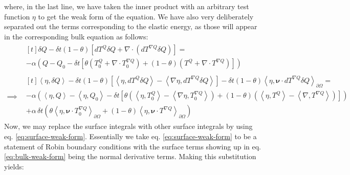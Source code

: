 \documentclass[reqno]{article}
\begin{document}
where, in the last line, we have taken the inner product with an arbitrary test function $\eta$ to get the weak form of the equation.
We have also very deliberately separated out the terms corresponding to the elastic energy, as those will appear in the corresponding bulk equation as follows:
\begin{equation} \label{eq:bulk-weak-form}
\begin{split}
&\begin{multlined}[t]
    \delta Q - \delta t \left(1 - \theta \right) \left[dT^Q \delta Q + \nabla \cdot \left( dT^{\nabla Q} \delta Q \right)\right] 
    = \\
    - \alpha \left( 
        Q - Q_0 - \delta t \left[ 
            \theta \left(T_0^Q + \nabla \cdot T_0^{\nabla Q} \right)
            + \left(1 - \theta \right) \left( T^Q + \nabla \cdot T^{\nabla Q} \right)
        \right]
    \right)
\end{multlined} \\
\implies
&\begin{multlined}[t]
    \left<\eta, \delta Q\right> 
    - \delta t \left(1 - \theta \right) \left[
        \left<\eta, dT^Q \delta Q\right> 
        - \left<\nabla \eta, dT^{\nabla Q} \delta Q \right>
    \right] 
    - \delta t \left(1 - \theta \right) \left< \eta, \boldsymbol\nu \cdot dT^{\nabla Q} \delta Q\right>_{\partial \Omega}
    = \\
    - \alpha \left( 
        \left<\eta, Q\right> - \left<\eta, Q_0\right> - \delta t \left[ 
            \theta \left(\left<\eta, T_0^Q\right> - \left<\nabla \eta, T_0^{\nabla Q} \right> \right)
            + \left(1 - \theta \right) \left( \left<\eta, T^Q\right> - \left<\nabla, T^{\nabla Q} \right> \right)
        \right]
    \right) \\
    + \alpha \, \delta t \left(
        \theta \left<\eta, \boldsymbol\nu \cdot T_0^{\nabla Q}\right>_{\partial \Omega}
        + \left(1 - \theta\right) \left<\eta, \boldsymbol\nu \cdot T^{\nabla Q} \right>_{\partial \Omega}
    \right)
\end{multlined}
\end{split}
\end{equation}
Now, we may replace the surface integrals with other surface integrals by using eq. \eqref{eq:surface-weak-form}.
Essentially we take eq. \eqref{eq:surface-weak-form} to be a statement of Robin boundary conditions with the surface terms showing up in eq. \eqref{eq:bulk-weak-form} being the normal derivative terms.
Making this substitution yields:
\end{document}
